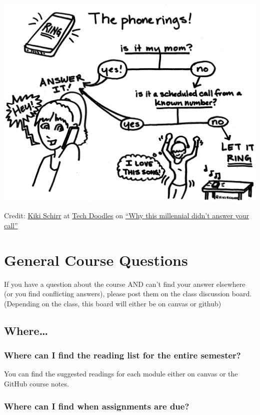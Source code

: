 \begin{center}\includegraphics[width=0.5\linewidth]{img/why-this-millennial-didnt-answer-your-call} \end{center}

Credit: \href{https://kikischirr.medium.com/}{Kiki Schirr} at \href{https://medium.com/tech-doodles}{Tech Doodles} on \href{https://medium.com/tech-doodles/why-this-millennial-didnt-answer-your-call-d5abccf06cfc}{``Why this millennial didn't answer your call''}

\hypertarget{general-course-questions}{%
\section{General Course Questions}\label{general-course-questions}}

If you have a question about the course AND can't find your answer elsewhere (or you find conflicting answers), please post them on the class discussion board. (Depending on the class, this board will either be on canvas or github)

\hypertarget{where}{%
\subsection{Where\ldots{}}\label{where}}

\hypertarget{where-can-i-find-the-reading-list-for-the-entire-semester}{%
\subsubsection{Where can I find the reading list for the entire semester?}\label{where-can-i-find-the-reading-list-for-the-entire-semester}}

You can find the suggested readings for each module either on canvas or the GitHub course notes.

\hypertarget{where-can-i-find-when-assignments-are-due}{%
\subsubsection{Where can I find when assignments are due?}\label{where-can-i-find-when-assignments-are-due}}

